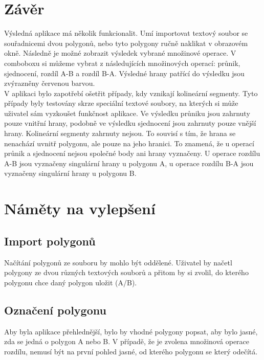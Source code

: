 \documentclass[a4paper,11pt,twoside]{article}
\begin{document}
\newpage
{}

\vspace*{-1cm}
\section{Závěr}
\noindent
\large
Výsledná aplikace má několik funkcionalit. Umí importovat textový soubor se souřadnicemi dvou polygonů, nebo tyto polygony ručně naklikat v obrazovém okně. Následně je možné zobrazit výsledek vybrané množinové operace. V comboboxu si můžeme vybrat z následujících množinových operací: průnik, sjednocení, rozdíl A-B a rozdíl B-A. Výsledné hrany patřící do výsledku jsou zvýrazněny červenou barvou. \\
V aplikaci bylo zapotřebí ošetřit případy, kdy vznikají kolineární segmenty. Tyto případy byly testovány skrze speciální textové soubory, na kterých si může uživatel sám vyzkoušet funkčnost aplikace. Ve výsledku průniku jsou zahrnuty pouze vnitřní hrany, podobně ve výsledku sjednocení jsou zahrnuty pouze vnější hrany. Kolineární segmenty zahrnuty nejsou. To souvisí s tím, že hrana se nenachází uvnitř polygonu, ale pouze na jeho hranici. To znamená, že u operací průnik a sjednocení nejsou společné body ani hrany vyznačeny. U operace rozdílu A-B jsou vyznačeny singulární hrany u polygonu A, u operace rozdílu B-A jsou vyznačeny singulární hrany u polygonu B.

\section{Náměty na vylepšení}

\subsection{Import polygonů}
Načítání polygonů ze souboru by mohlo být oddělené. Uživatel by načetl polygony ze dvou různých textových souborů a přitom by si zvolil, do kterého polygonu chce daný polygon uložit (A/B).

\subsection{Označení polygonu}
Aby byla aplikace přehlednější, bylo by vhodné polygony popsat, aby bylo jasné, zda se jedná o polygon A nebo B. V případě, že je zvolena množinová operace rozdílu, nemusí být na první pohled jasné, od kterého polygonu se který odečítá.


\newpage
\vspace*{-6ex}
\renewcommand{\refname}{Literatura} 
    
    
 
\end{document}
